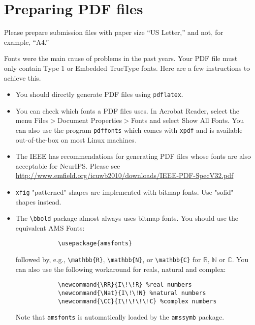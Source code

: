 \documentclass{article}
\begin{document}
	\section{Preparing PDF files}
	
	Please prepare submission files with paper size ``US Letter,'' and not, for
	example, ``A4.''
	
	Fonts were the main cause of problems in the past years. Your PDF file must only
	contain Type 1 or Embedded TrueType fonts. Here are a few instructions to
	achieve this.
	
	\begin{itemize}
		
		\item You should directly generate PDF files using \verb+pdflatex+.
		
		\item You can check which fonts a PDF files uses.  In Acrobat Reader, select the
		menu Files$>$Document Properties$>$Fonts and select Show All Fonts. You can
		also use the program \verb+pdffonts+ which comes with \verb+xpdf+ and is
		available out-of-the-box on most Linux machines.
		
		\item The IEEE has recommendations for generating PDF files whose fonts are also
		acceptable for NeurIPS. Please see
		\url{http://www.emfield.org/icuwb2010/downloads/IEEE-PDF-SpecV32.pdf}
		
		\item \verb+xfig+ "patterned" shapes are implemented with bitmap fonts.  Use
		"solid" shapes instead.
		
		\item The \verb+\bbold+ package almost always uses bitmap fonts.  You should use
		the equivalent AMS Fonts:
		\begin{verbatim}
			\usepackage{amsfonts}
		\end{verbatim}
		followed by, e.g., \verb+\mathbb{R}+, \verb+\mathbb{N}+, or \verb+\mathbb{C}+
		for $\mathbb{R}$, $\mathbb{N}$ or $\mathbb{C}$.  You can also use the following
		workaround for reals, natural and complex:
		\begin{verbatim}
			\newcommand{\RR}{I\!\!R} %real numbers
			\newcommand{\Nat}{I\!\!N} %natural numbers
			\newcommand{\CC}{I\!\!\!\!C} %complex numbers
		\end{verbatim}
		Note that \verb+amsfonts+ is automatically loaded by the \verb+amssymb+ package.
		
	\end{itemize}
	
\end{document}
